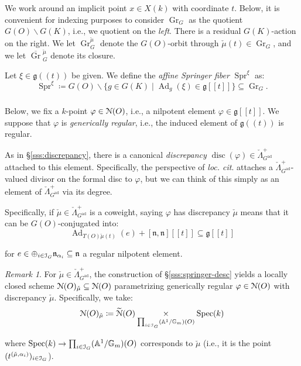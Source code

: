 \documentclass[reqno,11pt]{amsart}
\numberwithin{equation}{subsection}
\theoremstyle{remark}
\newtheorem{rem}[thm]{Remark}
\newcommand{\bA}{{\mathbb A}}
\newcommand{\bG}{{\mathbb G}}
\newcommand{\sI}{{\EuScript I}}
\newcommand{\sN}{{\EuScript N}}
\newcommand{\fg}{{\mathfrak g}}
\newcommand{\fn}{{\mathfrak n}}
\newcommand{\on}{\operatorname}
\newcommand{\ol}[1]{\overline{#1}{}}
\newcommand{\Spec}{\on{Spec}}
\newcommand{\ad}{\on{ad}}
\newcommand{\Ad}{\on{Ad}}
\newcommand{\vph}{\varphi}
\newcommand{\Gr}{\on{Gr}}
\newcommand{\Spr}{\on{Spr}}
\renewcommand{\subset}{\subseteq}
\begin{document}
We work around an implicit point $x \in X(k)$ with coordinate $t$.
Below, it is convenient for indexing purposes 
to consider $\Gr_G$ as the quotient $G(O)\backslash G(K)$, i.e., we
quotient on the \emph{left}. There is a residual $G(K)$-action on the
right. We let $\Gr_G^{\check{\mu}}$ denote the $G(O)$-orbit through 
$\check{\mu}(t) \in\Gr_G$, and we let $\ol{\Gr}_G^{\check{\mu}}$ denote
its closure.

Let $\xi \in \fg((t))$ be given. We define the \emph{affine Springer fiber}
$\Spr^{\xi}$ as: 
%
\[
\Spr^{\xi} \coloneqq
G(O)\backslash \{g \in G(K) \mid \Ad_g(\xi) \in \fg[[t]]\} \subset \Gr_G.
\]


\subsubsection{}

Below, we fix a $k$-point $\vph \in \sN(O)$, i.e., 
a nilpotent element $\vph \in \fg[[t]]$. We suppose
that $\vph$ is \emph{generically regular}, i.e., 
the induced element of $\fg((t))$ is regular.

As in \S \ref{sss:discrepancy}, there is a canonical
\emph{discrepancy} $\on{disc}(\vph) \in \check{\Lambda}_{G^{\ad}}^+$ 
attached to this element. Specifically, the perspective of
\emph{loc. cit}. attaches a $\check{\Lambda}_{G^{\ad}}^+$-valued divisor
on the formal disc to $\vph$, but we can think of this simply 
as an element of $\check{\Lambda}_{G^{\ad}}^+$ via its degree.

Specifically, if $\check{\mu} \in \check{\Lambda}_{G^{\ad}}^+$ is 
a coweight, saying $\vph$ has discrepancy $\check{\mu}$ means
that it can be $G(O)$-conjugated into:
%
\begin{equation}\label{eq:discrepancy-explicit}
\Ad_{T(O)\check{\mu}(t)}(e)+[\fn,\fn][[t]] \subset \fg[[t]]
\end{equation}

\noindent for $e \in \oplus_{i \in \sI_G}\fn_{\alpha_i} \subset \fn$ 
a regular nilpotent element.

\begin{rem}

For $\check{\mu} \in \check{\Lambda}_{G^{\ad}}^+$, 
the construction of \S \ref{sss:springer-desc} yields
a locally closed scheme $\sN(O)_{\check{\mu}} \subset \sN(O)$
parametrizing generically regular $\vph \in \sN(O)$ with
discrepancy $\check{\mu}$. Specifically, 
we take:
%
\[
\sN(O)_{\check{\mu}} \coloneqq \widetilde{\sN}(O) 
\underset{\prod_{i \in \sI_G} (\bA^1/\bG_m)(O)}{\times} \Spec(k)
\]

\noindent where $\Spec(k) \to \prod_{i \in \sI_G} (\bA^1/\bG_m)(O)$
corresponds to $\check{\mu}$ (i.e., it is the point
$(t^{(\check{\mu},\alpha_i)})_{i \in \sI_G}$).

\end{rem}
\end{document}
